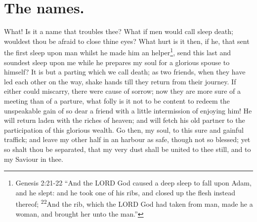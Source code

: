 \section{The names.}
What! Is it a name that troubles thee? What if men would call sleep death; wouldest thou be afraid to close thine eyes? What hurt is it then, if he, that sent the first sleep upon man whilst he made him an helper\footnote{Genesis 2:21-22 ``And the LORD God caused a deep sleep to fall upon Adam, and he slept: and he took one of his ribs, and closed up the flesh instead thereof; \textsuperscript{22}And the rib, which the LORD God had taken from man, made he a woman, and brought her unto the man.''}, send this last and soundest sleep upon me while he prepares my soul for a glorious spouse to himself? It is but a parting which we call death; as two friends, when they have led each other on the way, shake hands till they return from their journey. If either could miscarry, there were cause of sorrow; now they are more sure of a meeting than of a parture, what folly is it not to be content to redeem the unspeakable gain of so dear a friend with a little intermission of enjoying him! He will return laden with the riches of heaven; and will fetch his old partner to the participation of this glorious wealth. Go then, my soul, to this sure and gainful traffick; and leave my other half in an harbour as safe, though not so blessed; yet so shalt thou be separated, that my very dust shall be united to thee still, and to my Saviour in thee. 
